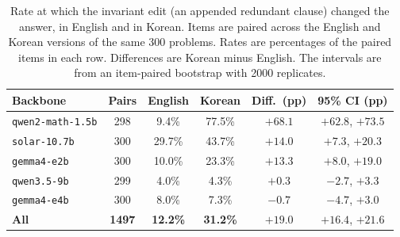\begin{table}[t]
\small\setlength{\tabcolsep}{3pt}
\caption{Rate at which the invariant edit (an appended redundant clause) changed the answer, in English and in Korean. Items are paired across the English and Korean versions of the same 300 problems. Rates are percentages of the paired items in each row. Differences are Korean minus English. The intervals are from an item-paired bootstrap with 2000 replicates.\label{tab:crosslingual}}
\begin{tabularx}{\textwidth}{lCCCCC}
\toprule
\textbf{Backbone} & \textbf{Pairs} & \textbf{English} & \textbf{Korean} & \textbf{Diff.\ (pp)} & \textbf{95\% CI (pp)} \\
\midrule
\texttt{qwen2-math-1.5b} & 298 & 9.4\% & 77.5\% & $+68.1$ & $+62.8$, $+73.5$ \\
\texttt{solar-10.7b} & 300 & 29.7\% & 43.7\% & $+14.0$ & $+7.3$, $+20.3$ \\
\texttt{gemma4-e2b} & 300 & 10.0\% & 23.3\% & $+13.3$ & $+8.0$, $+19.0$ \\
\texttt{qwen3.5-9b} & 299 & 4.0\% & 4.3\% & $+0.3$ & $-2.7$, $+3.3$ \\
\texttt{gemma4-e4b} & 300 & 8.0\% & 7.3\% & $-0.7$ & $-4.7$, $+3.0$ \\
\midrule
\textbf{All} & \textbf{1497} & \textbf{12.2\%} & \textbf{31.2\%} & \textbf{$+19.0$} & \textbf{$+16.4$}, \textbf{$+21.6$} \\
\bottomrule
\end{tabularx}
\end{table}
